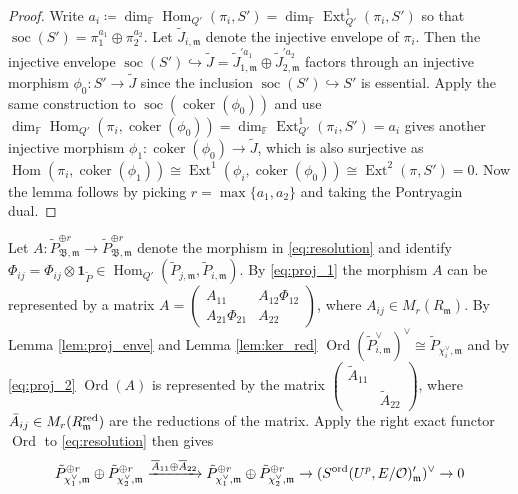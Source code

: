 \documentclass[leqno]{amsart}
\theoremstyle{definition}
\theoremstyle{remark}
\newcommand{\smat}[1]{\left(\begin{smallmatrix} #1 \end{smallmatrix}\right)}
\newcommand{\id}{\mathbf{1}}
\newcommand{\oo}{\mathcal{O}}
\newcommand{\fF}{\mathbb{F}} %
\newcommand{\A}{\mathbf A}
\DeclareMathOperator{\Hom}{Hom}
\DeclareMathOperator{\Ext}{Ext}
\DeclareMathOperator{\coker}{coker}
\newcommand{\fm}{\mathfrak{m}}
\DeclareMathOperator{\Ord}{Ord} %
\DeclareMathOperator{\soc}{soc}
\newcommand{\B}{\mathfrak B} %
\newcommand{\red}{\textnormal{red}}
\newcommand{\ord}{\textnormal{ord}} %
\begin{document}
\begin{proof}
Write $a_i\coloneqq \dim_{\fF} \Hom_{Q'}(\pi_i,S')=
\dim_{\fF} \Ext^1_{Q'}(\pi_i,S')$
so that $\soc(S')=\pi_1^{a_1}\oplus \pi_2^{a_2}$.
Let $\tilde{J}_{i,\fm}$ denote 
the injective envelope of $\pi_i$.
Then the injective envelope 
$\soc(S')\hookrightarrow \tilde{J}=
\tilde{J}_{1,\fm}^{'a_1}\oplus \tilde{J}_{2,\fm}^{'a_2}$
factors through an injective morphism 
$\phi_0\colon S'\to \tilde{J}$
since the inclusion $\soc(S')\hookrightarrow S'$
is essential.
Apply the same construction 
to $\soc(\coker(\phi_0))$
and use $\dim_{\fF}\Hom_{Q'}(\pi_i, \coker(\phi_0))=
\dim_{\fF}\Ext^1_{Q'}(\pi_i, S')=a_i$
gives another injective morphism
$\phi_1\colon \coker(\phi_0)\to \tilde{J}$,
which is also surjective as 
$\Hom(\pi_i,\coker(\phi_1))
\cong \Ext^1(\phi_i,\coker(\phi_0))
\cong \Ext^2(\pi, S')=0$.
Now the lemma follows by picking
$r=\max\{a_1,a_2\}$ and taking the Pontryagin dual.
\end{proof}

Let 
$A\colon \tilde{P}_{\B,\fm}^{\oplus r}\to\tilde{P}_{\B,\fm}^{\oplus r}$ 
denote the morphism in \eqref{eq:resolution} and
identify $\Phi_{ij}=\Phi_{ij}\otimes \id_{\tilde{P}}\in
\Hom_{Q'}(\tilde{P}_{j,\fm},\tilde{P}_{i,\fm})$.
By \eqref{eq:proj_1}
the morphism $A$
can be represented by a matrix
$A=\smat{A_{11} & A_{12}\Phi_{12}\\A_{21}\Phi_{21} & A_{22}}$,
where $A_{ij}\in M_r(R_{\fm})$.
By Lemma \ref{lem:proj_enve}
and Lemma \ref{lem:ker_red}
$\Ord(\tilde{P}_{i,\fm}^\vee)^\vee\cong 
\tilde{P}_{\chi_i^\vee,\fm}$
and by \eqref{eq:proj_2} $\Ord(A)$
is represented by the matrix
$\smat{\tilde{A}_{11} & \\& \tilde{A}_{22}}$,
where $\bar{A}_{ij}\in M_r(R^{\red}_{\fm})$ are 
the reductions of the matrix.
Apply the right exact functor
$\Ord$ to 
\eqref{eq:resolution} then gives
\begin{equation}\label{eq:exact_ord}
	\tilde{P}_{\chi_1^\vee,\fm}^{\oplus r}\oplus 
	\tilde{P}_{\chi_2^\vee,\fm}^{\oplus r}
	\xrightarrow{\overline{A}_{11}\oplus\overline{A}_{22}}
	\tilde{P}_{\chi_1^\vee,\fm}^{\oplus r}\oplus 
	\tilde{P}_{\chi_2^\vee,\fm}^{\oplus r}
	\to (S^{\ord}(U^p,E/\oo)_\fm')^\vee\to 0
\end{equation}
\end{document}
